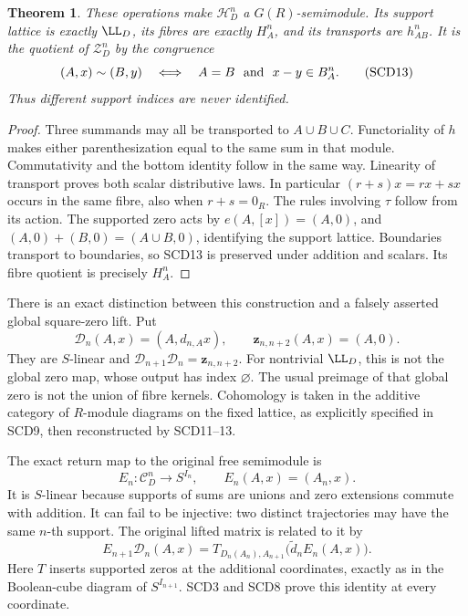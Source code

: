 \documentclass[11pt,a4paper]{article}
\newtheorem{theorem}{Theorem}[section]
\theoremstyle{definition}\newtheorem{definition}[theorem]{Definition}
\begin{document}
\begin{theorem}
These operations make \(\mathcal H_D^n\) a \(G(R)\)-semimodule.
Its support lattice is exactly \(\LL_D\), its fibres are exactly
\(H_A^n\), and its transports are \(h_{AB}^n\). It is the quotient
of \(\mathcal Z_D^n\) by the congruence
\[
 (A,x)\sim(B,y)
 \quad\Longleftrightarrow\quad A=B\ \hbox{ and }\ x-y\in B_A^n.
 \tag{SCD13}
\]
Thus different support indices are never identified.
\end{theorem}
\begin{proof}
Three summands may all be transported to \(A\cup B\cup C\).
Functoriality of \(h\) makes either parenthesization equal to
the same sum in that module. Commutativity and the bottom identity
follow in the same way. Linearity of transport proves both scalar
distributive laws. In particular \((r+s)x=rx+sx\) occurs in the
same fibre, also when \(r+s=0_R\). The rules involving \(\tau\)
follow from its action. The supported zero acts by
\(e(A,[x])=(A,0)\), and
\((A,0)+(B,0)=(A\cup B,0)\), identifying the support lattice.
Boundaries transport to boundaries, so SCD13 is preserved under
addition and scalars. Its fibre quotient is precisely \(H_A^n\).
\end{proof}

There is an exact distinction between this construction and a
falsely asserted global square-zero lift. Put
\[
 \mathcal D_n(A,x)=(A,d_{n,A}x),\qquad
 \mathbf z_{n,n+2}(A,x)=(A,0).
 \tag{SCD14}
\]
They are \(S\)-linear and
\(\mathcal D_{n+1}\mathcal D_n=\mathbf z_{n,n+2}\).
For nontrivial \(\LL_D\), this is not the global zero map,
whose output has index \(\varnothing\). The usual preimage of
that global zero is not the union of fibre kernels.
Cohomology is taken in the additive category of \(R\)-module
diagrams on the fixed lattice, as explicitly specified in SCD9,
then reconstructed by SCD11--13.

The exact return map to the original free semimodule is
\[
 E_n:\mathcal C_D^n\to S^{I_n},\qquad E_n(A,x)=(A_n,x).
 \tag{SCD15}
\]
It is \(S\)-linear because supports of sums are unions and
zero extensions commute with addition. It can fail to be injective:
two distinct trajectories may have the same \(n\)-th support.
The original lifted matrix is related to it by
\[
 E_{n+1}\mathcal D_n(A,x)
 =T_{D_n(A_n),A_{n+1}}\bigl(\widetilde d_n E_n(A,x)\bigr).
 \tag{SCD16}
\]
Here \(T\) inserts supported zeros at the additional coordinates,
exactly as in the Boolean-cube diagram of \(S^{I_{n+1}}\).
SCD3 and SCD8 prove this identity at every coordinate.
\end{document}
